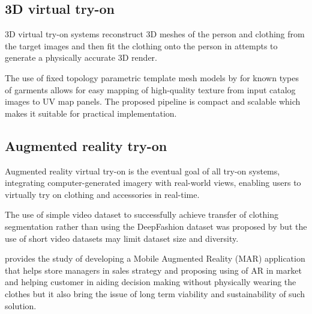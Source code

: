 
	\subsection{3D virtual try-on}
		3D virtual try-on systems reconstruct 3D meshes of the person and clothing from the target images and then fit the clothing onto the person in attempts to generate a physically accurate 3D render.


        The use of fixed topology parametric template mesh models by \cite{DBLP:conf/nips/SantestebanOTC22} for known types of garments allows for easy mapping of high-quality texture from input catalog images to UV map panels. The proposed pipeline is compact and scalable which makes it suitable for practical implementation.

	\subsection{Augmented reality try-on}
		Augmented reality virtual try-on is the eventual goal of all try-on systems, integrating computer-generated imagery with real-world views, enabling users to virtually try on clothing and accessories in real-time.
		
        The use of simple video dataset to successfully achieve transfer of clothing segmentation rather than using the DeepFashion dataset was proposed by  {
            but the use of short video datasets may limit dataset size and diversity.
        }

		\cite{DBLP:journals/ijim/El-SeoudT19} provides the study of developing a Mobile Augmented Reality (MAR) application that helps store managers in sales strategy and proposing using of AR in market and helping customer in aiding decision making without physically wearing the clothes but it also bring the issue of long term viability and sustainability of such solution.

